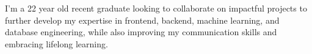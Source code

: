 \documentclass[letter,10pt]{article}
\begin{document}
\def\introstatement{I'm a 22 year old recent graduate looking to collaborate on impactful projects to further develop my expertise in frontend, backend, machine learning, and database engineering, while also improving my communication skills and embracing lifelong learning. }


\begin{flushleft}
    \introstatement{}
\end{flushleft}
\end{document}
